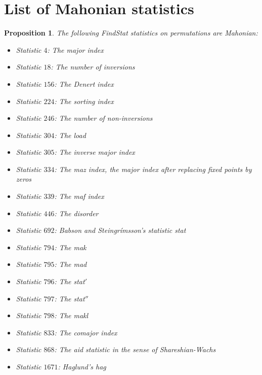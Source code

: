 \documentclass{amsart}
\newtheorem{prop}[thm]{Proposition}
\theoremstyle{definition}
\begin{document}
\section{List of Mahonian statistics}\label{appendix:mahonian}
\begin{prop}
  The following FindStat statistics on permutations are Mahonian:
  \begin{itemize}
    \item Statistic $4$: The major index
    \item Statistic $18$: The number of inversions
    \item Statistic $156$: The Denert index
    \item Statistic $224$: The sorting index
    \item Statistic $246$: The number of non-inversions
    \item Statistic $304$: The load
    \item Statistic $305$: The inverse major index
    \item Statistic $334$: The maz index, the major index after replacing fixed points by zeros
    \item Statistic $339$: The maf index
    \item Statistic $446$: The disorder
    \item Statistic $692$: Babson and Steingr\'imsson's statistic stat
    \item Statistic $794$: The mak
    \item Statistic $795$: The mad
    \item Statistic $796$: The stat$'$
    \item Statistic $797$: The stat$''$
    \item Statistic $798$: The makl
    \item Statistic $833$: The comajor index
    \item Statistic $868$: The aid statistic in the sense of Shareshian-Wachs
    \item Statistic $1671$: Haglund's hag
  \end{itemize}
\end{prop}
\end{document}
